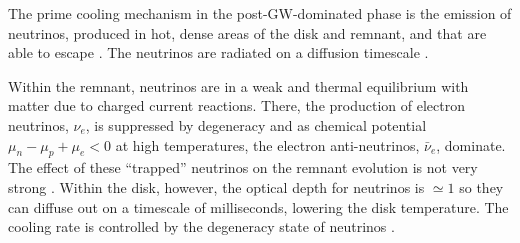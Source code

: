 The prime cooling mechanism in the post-\ac{GW}-dominated phase is the emission of 
neutrinos, produced in hot, dense areas of the disk and remnant, and that are 
able to escape \citep{Eichler:1989ve,Rosswog:2003rv,Sekiguchi:2011zd}. 
The neutrinos are radiated on a diffusion timescale \citep{Perego:2014fma}.

Within the remnant, neutrinos are in a weak and thermal equilibrium with matter 
due to charged current reactions. There, the production of electron neutrinos, $\nu_e$,
is suppressed by degeneracy and as chemical potential $\mu_n-\mu_p+\mu_e<0$ at high temperatures, 
the electron anti-neutrinos, $\bar{\nu}_{e}$, dominate. The effect of these ``trapped'' 
neutrinos on the remnant evolution is not very strong \citep{Foucart:2015gaa,Perego:2019adq}.
%
Within the disk, however, the optical depth for neutrinos is ${\simeq}1$ so 
they can diffuse out on a timescale of milliseconds, lowering the disk 
temperature. The cooling rate is controlled by the degeneracy state of neutrinos 
\citep{Beloborodov:2008nx}.

